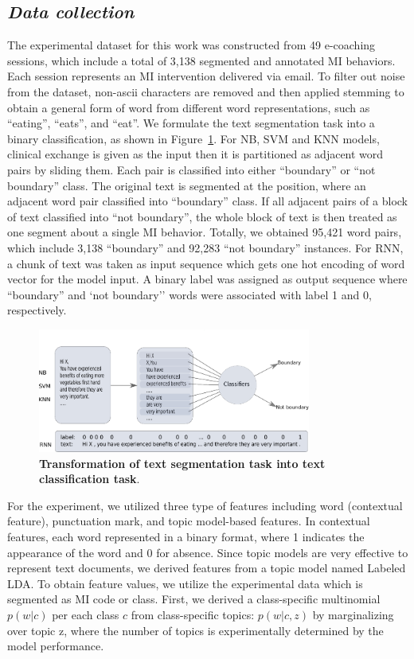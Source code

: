 \documentclass{amia}
\begin{document}
\subsection*{\textit{Data collection}}
The experimental dataset for this work was constructed from 49 e-coaching sessions, which include a total of 3,138 segmented and annotated MI behaviors. Each session represents an MI intervention delivered via email. To filter out noise from the dataset, non-ascii characters are removed and then applied stemming to obtain a general form of word from different word representations, such as ``eating'', ``eats'', and ``eat''. We formulate the text segmentation task into a binary classification, as shown in Figure~\ref{fig:classifier}. For NB, SVM and KNN models, clinical exchange is given as the input then it is partitioned as adjacent word pairs by sliding them. Each pair is classified into either ``boundary'' or ``not boundary'' class. The original text is segmented at the position, where an adjacent word pair classified into ``boundary'' class. If all adjacent pairs of a block of text classified into ``not boundary'', the whole block of text is then treated as one segment about a single MI behavior. Totally, we obtained 95,421 word pairs, which include 3,138 ``boundary'' and 92,283 ``not boundary'' instances. For RNN, a chunk of text was taken as input sequence which gets one hot encoding of word vector for the model input. A binary label was assigned as output sequence where ``boundary'' and `not boundary'' words were associated with label 1 and 0, respectively.    

\begin{figure}[!htb]
    \centering
    \includegraphics[width=0.80\textwidth]{figures/classifier.pdf}
    \caption{\textbf{Transformation of text segmentation task into text classification task}.}
    \label{fig:classifier}
\end{figure}

For the experiment, we utilized three type of features including word (contextual feature), punctuation mark, and topic model-based features. In contextual features, each word represented in a binary format, where 1 indicates the appearance of the word and 0 for absence. Since topic models are very effective\cite{kotov2015interpretable,hashimoto2016topic,lu2016modeling} to represent text documents, we derived features from a topic model named Labeled LDA\cite{ramage2009labeled}. To obtain feature values, we utilize the experimental data which is segmented as MI code or class. First, we derived a class-specific multinomial $p(w|c)$ per each class $c$ from class-specific topics: $p(w|c, z)$ by marginalizing over topic z, where the number of topics is experimentally determined by the model performance\cite{kotov2015interpretable}. 
\end{document}
